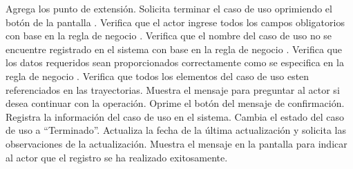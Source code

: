 \begin{UCtrayectoria}
    \UCpaso[\UCactor] Agrega los punto de extensión. \label{cu5.1:ingresaPE}
    \UCpaso[\UCactor] Solicita terminar el caso de uso oprimiendo el botón  de la pantalla .    
    \UCpaso[\UCsist] Verifica que el actor ingrese todos los campos obligatorios con base en la regla de negocio  . 
    \UCpaso[\UCsist] Verifica que el nombre del caso de uso no se encuentre registrado en el sistema con base en la regla de negocio  . 
    \UCpaso[\UCsist] Verifica que los datos requeridos sean proporcionados correctamente como se especifica en la regla de negocio .  
    \UCpaso[\UCsist] Verifica que todos los elementos del caso de uso esten referenciados en las trayectorias. 
    \UCpaso[\UCsist] Muestra el mensaje  para preguntar al actor si desea continuar con la operación.
    \UCpaso[\UCactor] Oprime el botón  del mensaje de confirmación. 
    \UCpaso[\UCsist] Registra la información del caso de uso en el sistema.
    \UCpaso[\UCsist] Cambia el estado del caso de uso a ``Terminado''.
    \UCpaso[\UCsist] Actualiza la fecha de la última actualización y solicita las observaciones de la actualización.
    \UCpaso[\UCsist] Muestra el mensaje  en la pantalla  
    para indicar al actor que el registro se ha realizado exitosamente.
 \end{UCtrayectoria}
 

